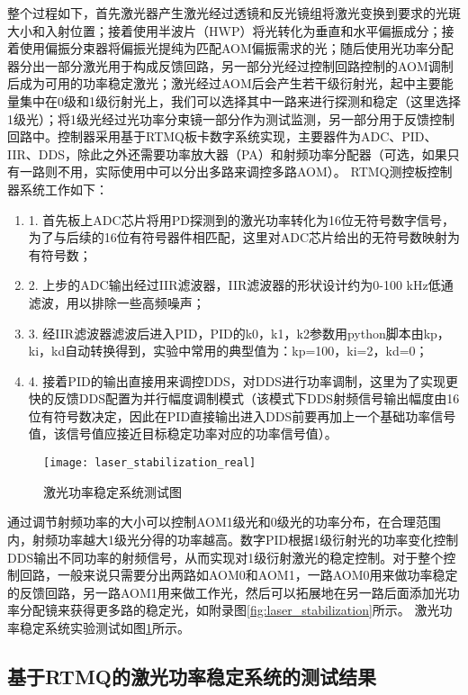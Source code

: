 整个过程如下，首先激光器产生激光经过透镜和反光镜组将激光变换到要求的光斑大小和入射位置；接着使用半波片（HWP）将光转化为垂直和水平偏振成分；接着使用偏振分束器将偏振光提纯为匹配AOM偏振需求的光；随后使用光功率分配器分出一部分激光用于构成反馈回路，另一部分光经过控制回路控制的AOM调制后成为可用的功率稳定激光；激光经过AOM后会产生若干级衍射光，起中主要能量集中在0级和1级衍射光上，我们可以选择其中一路来进行探测和稳定（这里选择1级光）；将1级光经过光功率分束镜一部分作为测试监测，另一部分用于反馈控制回路中。控制器采用基于RTMQ板卡数字系统实现，主要器件为ADC、PID、IIR、DDS，除此之外还需要功率放大器（PA）和射频功率分配器（可选，如果只有一路则不用，实际使用中可以分出多路来调控多路AOM）。
RTMQ测控板控制器系统工作如下：
\begin{enumerate}
    \item 1. 首先板上ADC芯片将用PD探测到的激光功率转化为16位无符号数字信号，为了与后续的16位有符号器件相匹配，这里对ADC芯片给出的无符号数映射为有符号数；
    \item 2. 上步的ADC输出经过IIR滤波器，IIR滤波器的形状设计约为0-100 kHz低通滤波，用以排除一些高频噪声；
    \item 3. 经IIR滤波器滤波后进入PID，PID的k0，k1，k2参数用python脚本由kp，ki，kd自动转换得到，实验中常用的典型值为：kp=100，ki=2，kd=0；
    \item 4. 接着PID的输出直接用来调控DDS，对DDS进行功率调制，这里为了实现更快的反馈DDS配置为并行幅度调制模式（该模式下DDS射频信号输出幅度由16位有符号数决定，因此在PID直接输出进入DDS前要再加上一个基础功率信号值，该信号值应接近目标稳定功率对应的功率信号值）。
\end{enumerate}

\begin{figure}
    \centering
    \texttt{[image: laser\_stabilization\_real]}
    \caption[激光功率稳定系统测试图]{激光功率稳定系统测试图\label{fig:laser_stabilization_real}}
\end{figure}

通过调节射频功率的大小可以控制AOM1级光和0级光的功率分布，在合理范围内，射频功率越大1级光分得的功率越高。数字PID根据1级衍射光的功率变化控制DDS输出不同功率的射频信号，从而实现对1级衍射激光的稳定控制。对于整个控制回路，一般来说只需要分出两路如AOM0和AOM1，一路AOM0用来做功率稳定的反馈回路，另一路AOM1用来做工作光，然后可以拓展地在另一路后面添加光功率分配镜来获得更多路的稳定光，如附录图\ref{fig:laser_stabilization}所示。
激光功率稳定系统实验测试如图\ref{fig:laser_stabilization_real}所示。




\subsection[基于RTMQ的激光功率稳定系统的测试结果]{基于RTMQ的激光功率稳定系统的测试结果}

